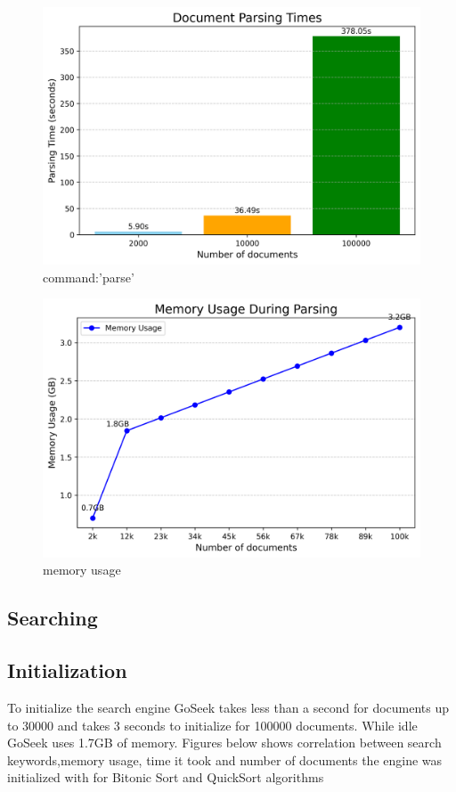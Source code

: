 \begin{figure}[h!]
    \centering
    \includegraphics[width=\textwidth]{parsing_times_chart.png}
    \caption{command:'parse'}
    \label{fig:cmd-parse}
\end{figure}
\begin{figure}[h!]
    \centering
    \includegraphics[width=\textwidth]{memory-usage.png}
    \caption{memory usage}
    \label{fig:memory-usage}
\end{figure}

\subsection{Searching}
    \subsection{Initialization}
    To initialize the search engine GoSeek takes less than a second for documents up to 30000 and takes 3 seconds to initialize for 100000 documents. While idle GoSeek uses 1.7GB of memory.
    Figures below  shows correlation between search keywords,memory usage, time it took and number of documents the engine was initialized with for Bitonic Sort and QuickSort algorithms


